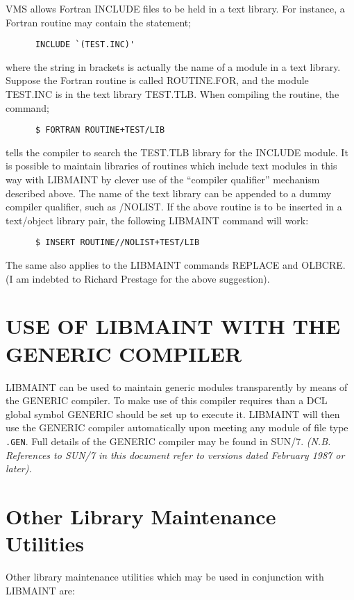 VMS allows Fortran INCLUDE files to be held in a text library.
For instance, a Fortran routine may contain the statement;
\begin{verbatim}
      INCLUDE `(TEST.INC)'
\end{verbatim}
where the string in brackets is actually the name of a module in
a text library.
Suppose the Fortran routine is called ROUTINE.FOR, and the module
TEST.INC is in the text library TEST.TLB.
When compiling the routine, the command;
\begin{verbatim}
      $ FORTRAN ROUTINE+TEST/LIB
\end{verbatim}
tells the compiler to search the TEST.TLB library for the INCLUDE
module.
It is possible to maintain libraries of routines which include text
modules in this way with LIBMAINT by clever use of the ``compiler
qualifier'' mechanism described above.
The name of the text library can be appended to a dummy compiler
qualifier, such as /NOLIST.
If the above routine is to be inserted in a text/object library pair,
the following LIBMAINT command will work:
\begin{verbatim}
      $ INSERT ROUTINE//NOLIST+TEST/LIB
\end{verbatim}
The same also applies to the LIBMAINT commands REPLACE and OLBCRE.
(I am indebted to Richard Prestage for the above suggestion).

\section{USE OF LIBMAINT WITH THE GENERIC COMPILER}
LIBMAINT can be used to maintain generic modules transparently
by means of the GENERIC compiler.
To make use of this compiler requires than a DCL global symbol
GENERIC should be set up to execute it.
LIBMAINT will then use the GENERIC compiler automatically
upon meeting any module of file type {\tt .GEN}.
Full details of the GENERIC compiler may be found in SUN/7.
{\it (N.B. References to SUN/7 in this document refer to versions
dated February 1987 or later).}

\section{Other Library Maintenance Utilities}

Other library maintenance utilities which may be used in conjunction
with LIBMAINT are:


\settowidth{\numlen}{00000000000}
\settowidth{\labelsep}{000}

